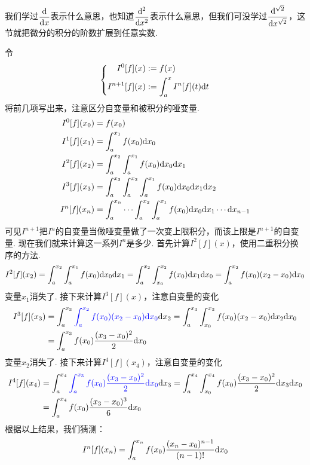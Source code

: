 \documentclass[UTF8]{ctexart}
\newcommand{\trm}[1]{{\rm #1}}
\begin{document}
我们学过\(\displaystyle{\frac{\trm{d}}{\trm{d}x}}\)表示什么意思，也知道\(\displaystyle{\frac{\trm{d^2}}{\trm{d}x^2}}\)表示什么意思，但我们可没学过\(\displaystyle{\frac{\trm{d^{\sqrt{2}}}}{\trm{d}x^{\sqrt{2}}}}\)，这节就把微分的积分的阶数扩展到任意实数.

令
\[
    \left\{
        \begin{aligned} 
            I^0[f](x) &:= f(x) \\ 
            I^{n+1}[f](x) &:= \int_a^x I^n[f](t) \trm{d}t
        \end{aligned}
    \right.
\]
将前几项写出来，注意区分自变量和被积分的哑变量.
\begin{align*}
    I^0[f](x_0) &= f(x_0) \\
    I^1[f](x_1) &= \int_{a}^{x_1}f(x_0)\trm{d}x_0 \\
    I^2[f](x_2) &= \int_{a}^{x_2}\int_{a}^{x_1}f(x_0)\trm{d}x_0\trm{d}x_1 \\
    I^3[f](x_3) &= \int_{a}^{x_3}\int_{a}^{x_2}\int_{a}^{x_1}f(x_0)\trm{d}x_0\trm{d}x_1\trm{d}x_2 \\
    I^n[f](x_n) &= \int_{a}^{x_n} \cdots \int_{a}^{x_2}\int_{a}^{x_1}f(x_0)\trm{d}x_0 \trm{d}x_1 \cdots \trm{d}x_{n-1} 
\end{align*}
可见\(I^{n+1}\)把\(I^n\)的自变量当做哑变量做了一次变上限积分，而该上限是\(I^{n+1}\)的自变量. 现在我们就来计算这一系列\(I^n\)是多少. 首先计算\(I^2[f](x)\)，使用二重积分换序的方法.
\[I^2[f](x_2) = \int_{a}^{x_2}\int_{a}^{x_1}f(x_0)\trm{d}x_0\trm{d}x_1 = \int_{a}^{x_2}\int_{x_0}^{x_2}f(x_0)\trm{d}x_1\trm{d}x_0 = \int_{a}^{x_2}f(x_0)(x_2-x_0)\trm{d}x_0\]
变量\(x_1\)消失了. 接下来计算\(I^3[f](x)\)，注意自变量的变化
\begin{align*}
    I^3[f](x_3) &= \int_{a}^{x_3} {\color{blue} \int_{a}^{x_2}f(x_0)(x_2-x_0)\trm{d}x_0}\trm{d}x_2 
    = \int_{a}^{x_3} \int_{x_0}^{x_3} f(x_0)(x_2-x_0)\trm{d}x_2 \trm{d}x_0 \\
    &= \int_{a}^{x_3} f(x_0)\frac{(x_3-x_0)^2}{2}\trm{d}x_0
\end{align*}
变量\(x_2\)消失了. 接下来计算\(I^4[f](x_4)\)，注意自变量的变化
\begin{align*}
    I^4[f](x_4) &= \int_{a}^{x_4} {\color{blue} \int_{a}^{x_3}f(x_0)\frac{(x_3-x_0)^2}{2}\trm{d}x_0}\trm{d}x_3
    = \int_{a}^{x_4} \int_{x_0}^{x_4} f(x_0)\frac{(x_3-x_0)^2}{2}\trm{d}x_3 \trm{d}x_0 \\
    &= \int_{a}^{x_4} f(x_0)\frac{(x_3-x_0)^3}{6}\trm{d}x_0
\end{align*}
根据以上结果，我们猜测：
\[I^n[f](x_n) = \int_{a}^{x_n} f(x_0)\frac{(x_n-x_0)^{n-1}}{(n-1)!}\trm{d}x_0\]
\end{document}
